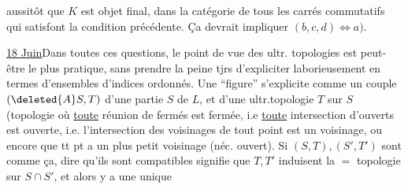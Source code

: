 aussitôt que $K$ est objet final, dans la catégorie de tous les carrés commutatifs
  qui satisfont la condition précédente. Ça devrait impliquer $(b,c,d)\Longleftrightarrow a)$.

\uline{18 Juin}\quad Dans toutes ces questions, le point de vue des ultr. topologies  est peut-être le plus pratique, sans prendre la peine tjrs d'expliciter laborieusement en termes d'ensembles d'indices ordonnés. Une ``figure''  s'explicite comme un couple $(\deleted{A}S,T)$ d'une partie $S$ de $L$, et d'une ultr.topologie $T$ sur $S$ (topologie où \uline{toute} réunion de fermés est fermée, i.e \uline{toute} intersection d'ouverts est ouverte, i.e. l'intersection des voisinages  de tout point est un voisinage, ou encore que tt pt a un plus petit voisinage (néc. ouvert). Si $(S,T),(S',T')$ sont comme ça, dire qu'ils sont compatibles signifie que $T,T'$ induisent la $=$ topologie sur $S\cap S'$,  et alors y a une unique
